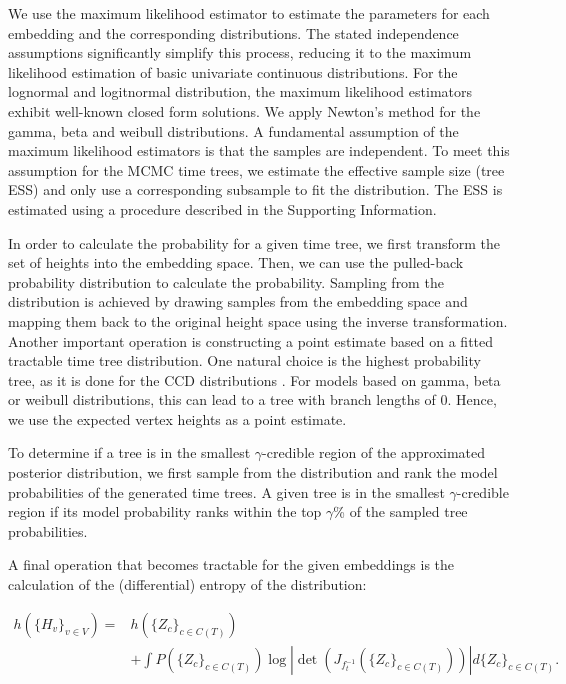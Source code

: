 \documentclass[10pt,letterpaper]{article}
\begin{document}
We use the maximum likelihood estimator to estimate the parameters for each embedding and the corresponding distributions. The stated independence assumptions significantly simplify this process, reducing it to the maximum likelihood estimation of basic univariate continuous distributions. For the lognormal and logitnormal distribution, the maximum likelihood estimators exhibit well-known closed form solutions. We apply Newton's method for the gamma, beta and weibull distributions. A fundamental assumption of the maximum likelihood estimators is that the samples are independent. To meet this assumption for the MCMC time trees, we estimate the effective sample size (tree ESS) and only use a corresponding subsample to fit the distribution. The ESS is estimated using a procedure described in the Supporting Information.

In order to calculate the probability for a given time tree, we first transform the set of heights into the embedding space. Then, we can use the pulled-back probability distribution to calculate the probability. Sampling from the distribution is achieved by drawing samples from the embedding space and mapping them back to the original height space using the inverse transformation. Another important operation is constructing a point estimate based on a fitted tractable time tree distribution. One natural choice is the highest probability tree, as it is done for the CCD distributions \cite{ccd}. For models based on gamma, beta or weibull distributions, this can lead to a tree with branch lengths of $0$. Hence, we use the expected vertex heights as a point estimate.

To determine if a tree is in the smallest $\gamma$-credible region of the approximated posterior distribution, we first sample from the distribution and rank the model probabilities of the generated time trees. A given tree is in the smallest $\gamma$-credible region if its model probability ranks within the top $\gamma$\% of the sampled tree probabilities.

A final operation that becomes tractable for the given embeddings is the calculation of the (differential) entropy of the distribution:

\begin{equation*}
	\begin{split}
		h(\{H_v\}_{v \in V}) = &h(\{Z_c\}_{c \in C(T)}) \\
		& + \int P(\{Z_c\}_{c \in C(T)}) \log \left| \det{\left(J_{f_t^{-1}}(\{Z_c\}_{c \in C(T)})\right)} \right| d \{Z_c\}_{c \in C(T)}.
	\end{split}
\end{equation*}
\end{document}
